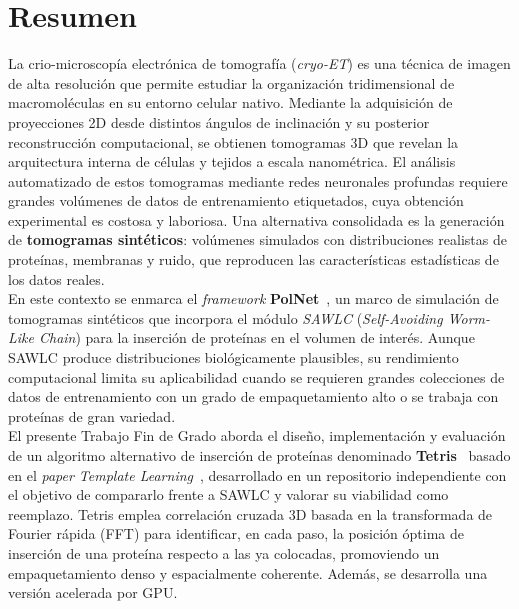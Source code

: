 

\chapter*{Resumen}

La crio-microscopía electrónica de tomografía (\textit{cryo-ET}) es una técnica de imagen de alta
resolución que permite estudiar la organización tridimensional de macromoléculas en su entorno
celular nativo. Mediante la adquisición de proyecciones 2D desde distintos ángulos de inclinación y su posterior reconstrucción computacional, se obtienen tomogramas 3D que revelan la arquitectura interna de células y tejidos a escala nanométrica. El análisis automatizado de estos tomogramas mediante redes neuronales profundas requiere grandes volúmenes de datos de entrenamiento etiquetados, cuya obtención experimental es costosa y laboriosa. Una alternativa consolidada es la generación de \textbf{tomogramas sintéticos}: volúmenes simulados con distribuciones realistas de proteínas, membranas y ruido, que reproducen las características estadísticas de los datos reales.\\

En este contexto se enmarca el \textit{framework} \textbf{PolNet}~\cite{martinezSanchezPolnetGithub}, un marco de simulación de tomogramas sintéticos que incorpora el módulo \textit{SAWLC} (\textit{Self-Avoiding Worm-Like Chain}) para la
inserción de proteínas en el volumen de interés. Aunque SAWLC produce distribuciones
biológicamente plausibles, su rendimiento computacional limita su aplicabilidad cuando se
requieren grandes colecciones de datos de entrenamiento con un grado de empaquetamiento alto o se trabaja con proteínas de gran variedad.\\

El presente Trabajo Fin de Grado aborda el diseño, implementación y evaluación de un algoritmo
alternativo de inserción de proteínas denominado \textbf{Tetris}~\cite{Hamo2025tetris_rep} basado en el \textit{paper Template Learning}~\cite{harastani2025template}, desarrollado en un repositorio
independiente con el objetivo de compararlo frente a SAWLC y valorar su viabilidad como reemplazo.
Tetris emplea correlación cruzada 3D basada en la transformada de Fourier rápida (FFT) para
identificar, en cada paso, la posición óptima de inserción de una proteína respecto a las ya
colocadas, promoviendo un empaquetamiento denso y espacialmente coherente. Además, se desarrolla una versión acelerada por GPU.\\

